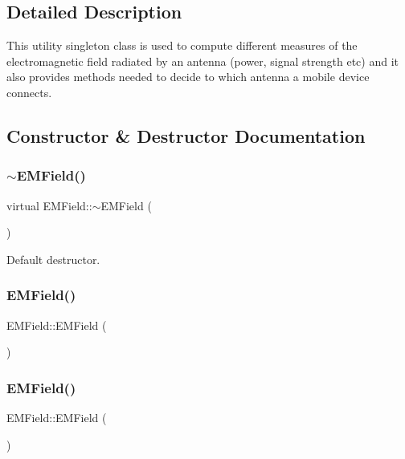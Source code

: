\subsection{Detailed Description}
This utility singleton class is used to compute different measures of the electromagnetic field radiated by an antenna (power, signal strength etc) and it also provides methods needed to decide to which antenna a mobile device connects. 

\subsection{Constructor \& Destructor Documentation}
\mbox{\label{class_e_m_field_abe7db07a27a120858107d5efa5f14edb}} 
\subsubsection{\texorpdfstring{$\sim$EMField()}{~EMField()}}
{\footnotesize\ttfamily virtual E\+M\+Field\+::$\sim$\+E\+M\+Field (\begin{DoxyParamCaption}{ }\end{DoxyParamCaption})\hspace{0.3cm}{\ttfamily [virtual]}}

Default destructor. \mbox{\label{class_e_m_field_a054f389cfa853008f32c02d874aa4d58}} 
\subsubsection{\texorpdfstring{EMField()}{EMField()}\hspace{0.1cm}{\footnotesize\ttfamily [1/2]}}
{\footnotesize\ttfamily E\+M\+Field\+::\+E\+M\+Field (\begin{DoxyParamCaption}{ }\end{DoxyParamCaption})\hspace{0.3cm}{\ttfamily [private]}}

\mbox{\label{class_e_m_field_a7760631ded36ba2c5a918c97a1cc93e9}} 
\subsubsection{\texorpdfstring{EMField()}{EMField()}\hspace{0.1cm}{\footnotesize\ttfamily [2/2]}}
{\footnotesize\ttfamily E\+M\+Field\+::\+E\+M\+Field (\begin{DoxyParamCaption}\item[{const \mbox{\hyperlink{class_e_m_field}{E\+M\+Field}} \&}]{ }\end{DoxyParamCaption})\hspace{0.3cm}{\ttfamily [private]}}



